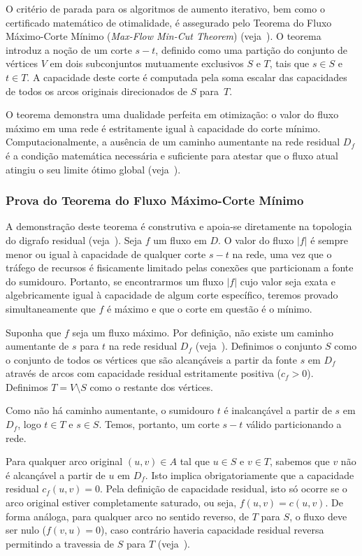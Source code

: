 \documentclass[12pt,a4paper]{article}
\begin{document}
O critério de parada para os algoritmos de aumento iterativo, bem como o certificado matemático de otimalidade, é assegurado pelo Teorema do Fluxo Máximo-Corte Mínimo (\textit{Max-Flow Min-Cut Theorem}) (veja~\cite{ford1956maximal}). O teorema introduz a noção de um corte $s-t$, definido como uma partição do conjunto de vértices $V$ em dois subconjuntos mutuamente exclusivos $S$ e $T$, tais que $s \in S$ e $t \in T$. A capacidade deste corte é computada pela soma escalar das capacidades de todos os arcos originais direcionados de $S$ para~$T$.

O teorema demonstra uma dualidade perfeita em otimização: o valor do fluxo máximo em uma rede é estritamente igual à capacidade do corte mínimo. Computacionalmente, a ausência de um caminho aumentante na rede residual $D_f$ é a condição matemática necessária e suficiente para atestar que o fluxo atual atingiu o seu limite ótimo global (veja~\cite{cook1998combinatorial}).

\subsubsection{Prova do Teorema do Fluxo Máximo-Corte Mínimo}

A demonstração deste teorema é construtiva e apoia-se diretamente na topologia do digrafo residual (veja~\cite{ford1956maximal, cook1998combinatorial}). Seja $f$ um fluxo em $D$. O valor do fluxo $|f|$ é sempre menor ou igual à capacidade de qualquer corte $s-t$ na rede, uma vez que o tráfego de recursos é fisicamente limitado pelas conexões que particionam a fonte do sumidouro. Portanto, se encontrarmos um fluxo $|f|$ cujo valor seja exata e algebricamente igual à capacidade de algum corte específico, teremos provado simultaneamente que $f$ é máximo e que o corte em questão é o mínimo.

Suponha que $f$ seja um fluxo máximo. Por definição, não existe um caminho aumentante de $s$ para $t$ na rede residual $D_f$ (veja~\cite{ahuja1993network}). Definimos o conjunto $S$ como o conjunto de todos os vértices que são alcançáveis a partir da fonte $s$ em $D_f$ através de arcos com capacidade residual estritamente positiva ($c_f > 0$). Definimos $T = V \setminus S$ como o restante dos vértices.

Como não há caminho aumentante, o sumidouro $t$ é inalcançável a partir de $s$ em $D_f$, logo $t \in T$ e $s \in S$. Temos, portanto, um corte $s-t$ válido particionando a rede.

Para qualquer arco original $(u,v) \in A$ tal que $u \in S$ e $v \in T$, sabemos que $v$ não é alcançável a partir de $u$ em $D_f$. Isto implica obrigatoriamente que a capacidade residual $c_f(u,v) = 0$. Pela definição de capacidade residual, isto só ocorre se o arco original estiver completamente saturado, ou seja, $f(u,v) = c(u,v)$. De forma análoga, para qualquer arco no sentido reverso, de $T$ para $S$, o fluxo deve ser nulo ($f(v,u) = 0$), caso contrário haveria capacidade residual reversa permitindo a travessia de $S$ para $T$ (veja~\cite{cook1998combinatorial}).
\end{document}
